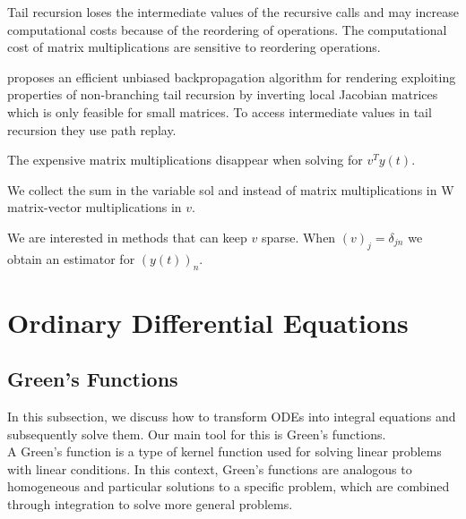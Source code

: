 \documentclass[a4paper,12pt]{article}
\begin{document}
Tail recursion loses the intermediate values
of the recursive calls and
may increase computational costs because of the reordering of operations.
The computational cost of matrix multiplications are sensitive
to reordering operations.

\begin{related}[non-branching tail recursion]
  \cite{vicini_path_2021} proposes an efficient unbiased backpropagation
  algorithm for rendering exploiting properties of non-branching tail recursion
  by inverting local Jacobian matrices which is only feasible for small matrices.
  To access intermediate values in tail recursion they use path replay.
\end{related}


The expensive matrix multiplications disappear when solving for $v^{T}y(t)$.

\begin{julia} \label{jl:adjoint main poisson}
  We collect the sum in the variable sol and instead of matrix multiplications in W
  matrix-vector multiplications in $v$.


  We are interested in methods that can keep $v$ sparse.
  When $(v)_{j} = \delta_{jn}$ we obtain an estimator for $(y(t))_{n}$.
\end{julia}

\section{Ordinary Differential Equations}

\subsection{Green's Functions}
\label{sec:greens functions}

In this subsection, we discuss how to transform ODEs into integral equations and
subsequently solve them. Our main tool for this is Green's functions. \\

A Green's function is a type of kernel function used
for solving linear problems with linear conditions. In this context,
Green's functions are analogous to homogeneous and particular solutions
to a specific problem, which are combined through integration to solve
more general problems.
\end{document}

